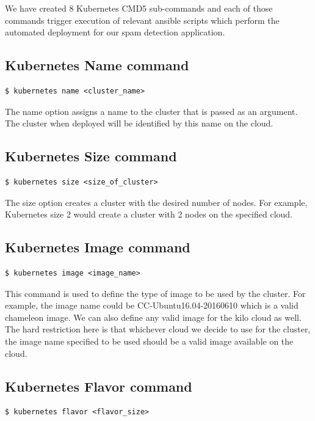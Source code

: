\documentclass[9pt,twocolumn,twoside]{../../styles/osajnl}
\begin{document}
{\noindent
We have created 8 Kubernetes CMD5 sub-commands and each of those
commands trigger execution of relevant ansible scripts which perform
the automated deployment for our spam detection application.\newline

\subsection{Kubernetes Name command}
\begin{verbatim}
$ kubernetes name <cluster_name>
\end{verbatim}

\noindent
The name option assigns a name to the cluster that is passed as an
argument. The cluster when deployed will be identified by this name on the
cloud.

\subsection{Kubernetes Size command}
\begin{verbatim}
$ kubernetes size <size_of_cluster>
\end{verbatim}

\noindent
The size option creates a cluster with the desired number of
nodes. For example, Kubernetes size 2 would create a cluster with 2
nodes on the specified cloud.

\subsection{Kubernetes Image command}
\begin{verbatim}
$ kubernetes image <image_name>
\end{verbatim}

\noindent
This command is used to define the type of image to be used by the
cluster. For example, the image name could be CC-Ubuntu16.04-20160610
which is a valid chameleon image. We can also define any valid image
for the kilo cloud as well. The hard restriction here is that
whichever cloud we decide to use for the cluster, the image name
specified to be used should be a valid image available on the cloud.

\subsection{Kubernetes Flavor command}
\begin{verbatim}
$ kubernetes flavor <flavor_size>
\end{verbatim}

}
\end{document}
